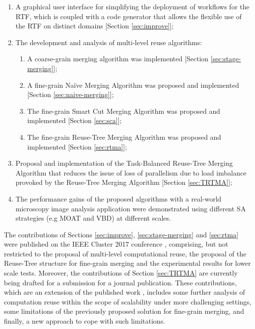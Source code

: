 \begin{enumerate}
  \item A graphical user interface for simplifying the deployment of workflows for the RTF, which is coupled with a code generator that allows the flexible use of the RTF on distinct domains [Section \ref{sec:improve}];
  
  \item The development and analysis of multi-level reuse algorithms:
  \begin{enumerate}
    \item A coarse-grain merging algorithm was implemented [Section \ref{sec:stage-merging}];
    \item A fine-grain Na\"ive Merging Algorithm was proposed and implemented [Section \ref{sec:naive-merging}];
    \item The fine-grain Smart Cut Merging Algorithm was proposed and implemented [Section \ref{sec:sca}];
    \item The fine-grain Reuse-Tree Merging Algorithm was proposed and implemented [Section \ref{sec:rtma}];
  \end{enumerate}
  
  \item Proposal and implementation of the Task-Balanced Reuse-Tree Merging Algorithm that reduces the issue of loss of parallelism due to load imbalance provoked by the Reuse-Tree Merging Algorithm [Section \ref{sec:TRTMA}];
  
  \item The performance gains of the proposed algorithms with a real-world microscopy image analysis application were demonstrated using different SA strategies (e.g MOAT and VBD) at different scales.

  
\end{enumerate}

The contributions of Sections \ref{sec:improve}, \ref{sec:stage-merging} and \ref{sec:rtma} were published on the IEEE Cluster 2017 conference \cite{barreiros_parallel_2017}, comprising, but not restricted to the proposal of multi-level computational reuse, the proposal of the Reuse-Tree structure for fine-grain merging and the experimental results for lower scale tests. Moreover, the contributions of Section \ref{sec:TRTMA} are currently being drafted for a submission for a journal publication. These contributions, which are an extension of the published work \cite{barreiros_parallel_2017}, includes some further analysis of computation reuse within the scope of scalability under more challenging settings, some limitations of the previously proposed solution for fine-grain merging, and finally, a new approach to cope with such limitations.

